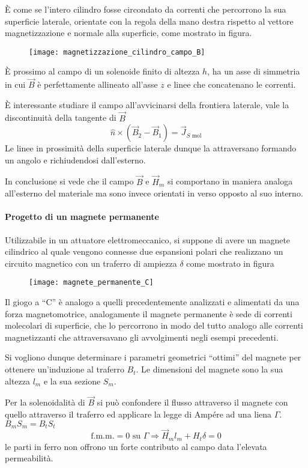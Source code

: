 È come se l'intero cilindro fosse circondato da correnti che percorrono la sua superficie
laterale, orientate con la regola della mano destra rispetto al vettore magnetizzazione
e normale alla superficie, come mostrato in figura.
\begin{figure}[H]
\centering
\texttt{[image: magnetizzazione\_cilindro\_campo\_B]}
\end{figure}

È prossimo al campo di un solenoide finito di altezza $h$, ha un asse di simmetria
in cui $\vec{B}$ è perfettamente allineato all'asse $z$ e linee che concatenano le correnti.

È interessante studiare il campo all'avvicinarsi della frontiera laterale, vale la 
discontinuità della tangente di $\vec{B}$
$$
\hat{n}\times\left(\vec{B}_2-\vec{B}_1\right) = \vec{J}_{S\text{ mol}}
$$
Le linee in prossimità della superficie laterale dunque la attraversano formando un angolo
e richiudendosi dall'esterno.

In conclusione si vede che il campo $\vec{B}$ e $\vec{H}_m$ si comportano in maniera 
analoga all'esterno del materiale ma sono invece orientati in verso opposto al suo interno.

\newpage
\paragraph{Progetto di un magnete permanente}
Utilizzabile in un attuatore elettromeccanico, si suppone di avere un magnete cilindrico
al quale vengono connesse due espansioni polari che realizzano un circuito magnetico
con un traferro di ampiezza $\delta$ come mostrato in figura
\begin{figure}[H]
\centering
\texttt{[image: magnete\_permanente\_C]}
\end{figure}

Il giogo a ``C'' è analogo a quelli precedentemente analizzati e alimentati da una 
forza magnetomotrice, analogamente il magnete permanente è sede di correnti
molecolari di superficie, che lo percorrono in modo del tutto analogo alle correnti
magnetizzanti che attraversavano gli avvolgimenti negli esempi precedenti.

Si vogliono dunque determinare i parametri geometrici ``ottimi''
del magnete per ottenere un'induzione al traferro $B_t$.
Le dimensioni del magnete sono la sua altezza $l_m$ e la sua sezione $S_m$.

Per la solenoidalità di $\vec{B}$ si può confondere il flusso attraverso il magnete con 
quello attraverso il traferro ed applicare la legge di Ampére ad una liena $\Gamma$.
$B_mS_m = B_tS_t$
$$
\text{f.m.m.} = 0 \text{ su }\Gamma \Rightarrow \vec{H}_ml_m + H_t\delta = 0
$$
le parti in ferro non offrono un forte contributo al campo data l'elevata permeabilità.


